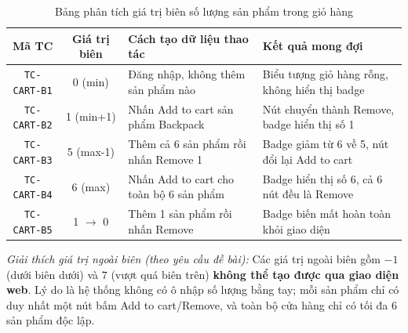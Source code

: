 \documentclass[a4paper]{article}
\begin{document}
\begin{table}[H]
\centering
\small
\begin{tabularx}{\textwidth}{|c|c|p{5.5cm}|X|}
\hline
\textbf{Mã TC} & \textbf{Giá trị biên} & \textbf{Cách tạo dữ liệu thao tác} & \textbf{Kết quả mong đợi} \\ \hline
\texttt{TC-CART-B1} & 0 (min) & Đăng nhập, không thêm sản phẩm nào & Biểu tượng giỏ hàng rỗng, không hiển thị badge \\ \hline
\texttt{TC-CART-B2} & 1 (min+1) & Nhấn Add to cart sản phẩm Backpack & Nút chuyển thành Remove, badge hiển thị số 1 \\ \hline
\texttt{TC-CART-B3} & 5 (max-1) & Thêm cả 6 sản phẩm rồi nhấn Remove 1 & Badge giảm từ 6 về 5, nút đổi lại Add to cart \\ \hline
\texttt{TC-CART-B4} & 6 (max) & Nhấn Add to cart cho toàn bộ 6 sản phẩm & Badge hiển thị số 6, cả 6 nút đều là Remove \\ \hline
\texttt{TC-CART-B5} & 1 $\rightarrow$ 0 & Thêm 1 sản phẩm rồi nhấn Remove & Badge biến mất hoàn toàn khỏi giao diện \\ \hline
\end{tabularx}
\caption{Bảng phân tích giá trị biên số lượng sản phẩm trong giỏ hàng}
\end{table}

\noindent \textit{Giải thích giá trị ngoài biên (theo yêu cầu đề bài):} Các giá trị ngoài biên gồm $-1$ (dưới biên dưới) và $7$ (vượt quá biên trên) \textbf{không thể tạo được qua giao diện web}. Lý do là hệ thống không có ô nhập số lượng bằng tay; mỗi sản phẩm chỉ có duy nhất một nút bấm Add to cart/Remove, và toàn bộ cửa hàng chỉ có tối đa 6 sản phẩm độc lập.
\end{document}

